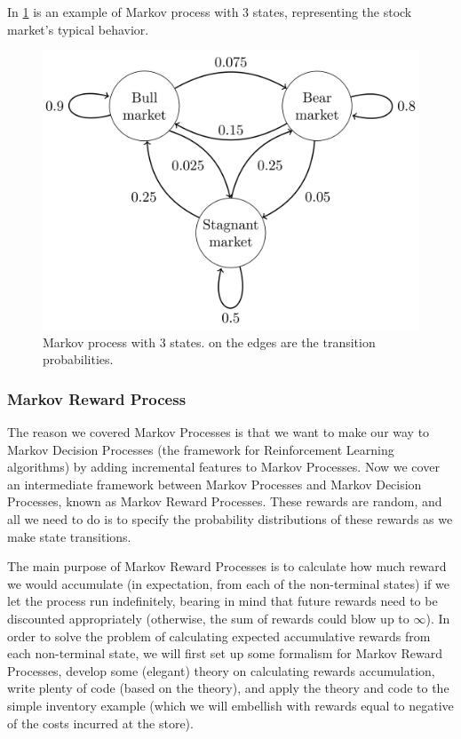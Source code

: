 \documentclass[../xlapes02]{subfiles}
\begin{document}
    In \cref{fig:markov-process} is an example of Markov process with 3 states, representing the stock market's typical behavior.

    \begin{figure}[h!]
        \includegraphics[width=0.5\linewidth]{image/mp}
        \centering
        \caption{Markov process with 3 states. on the edges are the transition probabilities.}
        \label{fig:markov-process}
    \end{figure}

    \subsubsection{Markov Reward Process}\label{subsubsec:markov-reward-process}
    The reason we covered Markov Processes is that we want to make our way to Markov Decision Processes (the framework for Reinforcement Learning algorithms) by adding incremental features to Markov Processes.
    Now we cover an intermediate framework between Markov Processes and Markov Decision Processes, known as Markov Reward Processes.
    These rewards are random, and all we need to do is to specify the probability distributions of these rewards as we make state transitions.

    The main purpose of Markov Reward Processes is to calculate how much reward we would accumulate (in expectation, from each of the non-terminal states) if we let the process run indefinitely, bearing in mind that future rewards need to be discounted appropriately (otherwise, the sum of rewards could blow up to $\infty$).
    In order to solve the problem of calculating expected accumulative rewards from each non-terminal state, we will first set up some formalism for Markov Reward Processes, develop some (elegant) theory on calculating rewards accumulation, write plenty of code (based on the theory), and apply the theory and code to the simple inventory example (which we will embellish with rewards equal to negative of the costs incurred at the store).
\end{document}
